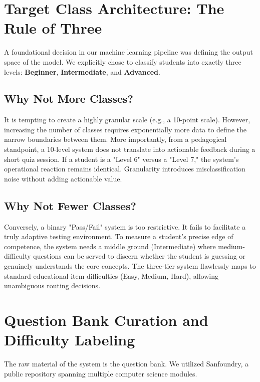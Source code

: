 \documentclass[11pt,a4paper]{article}
\begin{document}
\section{Target Class Architecture: The Rule of Three}
A foundational decision in our machine learning pipeline was defining the output space of the model. We explicitly chose to classify students into exactly three levels: \textbf{Beginner}, \textbf{Intermediate}, and \textbf{Advanced}.

\subsection{Why Not More Classes?}
It is tempting to create a highly granular scale (e.g., a 10-point scale). However, increasing the number of classes requires exponentially more data to define the narrow boundaries between them. More importantly, from a pedagogical standpoint, a 10-level system does not translate into actionable feedback during a short quiz session. If a student is a "Level 6" versus a "Level 7," the system's operational reaction remains identical. Granularity introduces misclassification noise without adding actionable value.

\subsection{Why Not Fewer Classes?}
Conversely, a binary "Pass/Fail" system is too restrictive. It fails to facilitate a truly adaptive testing environment. To measure a student's precise edge of competence, the system needs a middle ground (Intermediate) where medium-difficulty questions can be served to discern whether the student is guessing or genuinely understands the core concepts. The three-tier system flawlessly maps to standard educational item difficulties (Easy, Medium, Hard), allowing unambiguous routing decisions.

\section{Question Bank Curation and Difficulty Labeling}
The raw material of the system is the question bank. We utilized Sanfoundry, a public repository spanning multiple computer science modules. 
\end{document}
